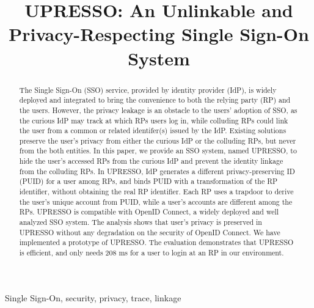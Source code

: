 \documentclass[conference, 10pt]{IEEEtran}
\begin{document}
\title{{UPRESSO}: An Unlinkable and Privacy-Respecting Single Sign-On System}
%
\maketitle
\begin{abstract}
 The Single Sign-On (SSO) service, provided by identity provider (IdP),  is widely deployed and integrated to bring the convenience to both the relying party (RP) and the users.
 However, the privacy leakage is an obstacle to the users' adoption of SSO, 
 as the curious IdP may track at which RPs users log in,
while colluding RPs could link the user from a common or related identifer(s) issued by the IdP.
 Existing solutions preserve the user's privacy  from either the curious IdP or the colluding RPs, but never from the both entities. 
In this paper, we provide an SSO system, named UPRESSO, to hide the user's accessed RPs from the curious IdP 
and prevent the identity linkage from the colluding RPs. 
In UPRESSO, IdP generates a different privacy-preserving ID (PUID) for a user among RPs, and binds PUID with a transformation of the RP identifier, without obtaining the real RP identifier.
Each RP uses a trapdoor to derive the user's unique account from PUID, 
while a user's accounts are different among the RPs.
UPRESSO  is compatible with OpenID Connect, a widely deployed and well analyzed SSO system. 
The analysis shows that user's privacy is preserved in UPRESSO without any degradation on the security of OpenID Connect.
We have implemented a prototype of UPRESSO. The evaluation demonstrates that UPRESSO is efficient, and only needs 208 ms for a user to login at an RP in our environment.
\end{abstract}
\begin{IEEEkeywords}
Single Sign-On, security, privacy, trace, linkage
\end{IEEEkeywords}















\end{document}
